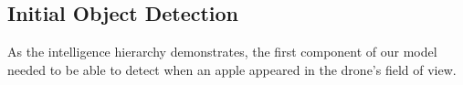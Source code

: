 \subsection{Initial Object Detection}
As the intelligence hierarchy demonstrates, the first component of our model needed to be able to detect when an apple appeared in the drone's field of view. 